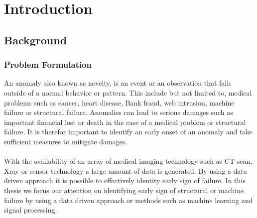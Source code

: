 \documentclass[../Main/thesis.tex]{subfiles}
\begin{document}
\chapter{Introduction}
\label{ch:introduction}

\section{Background}
\label{sec:background}
\subsection*{Problem Formulation}
An anomaly also known as novelty, is an event or an observation that falls outside of a normal behavior or pattern. This include but not limited to, medical problems such as cancer, heart disease, Bank fraud, web intrusion, machine failure or structural failure.
Anomalies can lead to serious damages such as important financial lost or death in the case of a medical problem or structural failure. It is therefor important to identify an early onset of an anomaly and take sufficient measures to mitigate damages.\\
\\
With the availability of an array of medical imaging technology such as CT scan, Xray or sensor technology a large amount of data is generated. By using a data driven approach it is possible to effectively identity early sign of failure. In this thesis we focus our attention on identifying early sign of structural or machine failure by using a data driven approach or methods such as machine learning and signal processing. 


\end{document}
